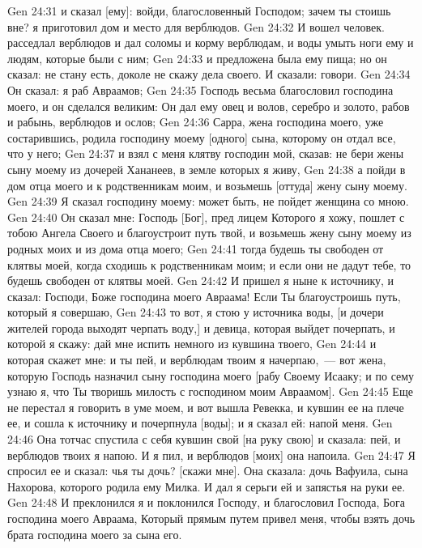\vs Gen 24:31 и сказал [ему]: войди, благословенный Господом; зачем ты стоишь вне? я приготовил дом и место для верблюдов.
\vs Gen 24:32 И вошел человек.  расседлал верблюдов и дал соломы и корму верблюдам, и воды умыть ноги ему и людям, которые были с ним;
\vs Gen 24:33 и предложена была ему пища; но он сказал: не стану есть, доколе не скажу дела своего. И сказали: говори.
\vs Gen 24:34 Он сказал: я раб Авраамов;
\vs Gen 24:35 Господь весьма благословил господина моего, и он сделался великим: Он дал ему овец и волов, серебро и золото, рабов и рабынь, верблюдов и ослов;
\vs Gen 24:36 Сарра, жена господина моего, уже состарившись, родила господину моему [одного] сына, которому он отдал все, что у него;
\vs Gen 24:37 и взял с меня клятву господин мой, сказав: не бери жены сыну моему из дочерей Хананеев, в земле которых я живу,
\vs Gen 24:38 а пойди в дом отца моего и к родственникам моим, и возьмешь [оттуда] жену сыну моему.
\vs Gen 24:39 Я сказал господину моему: может быть, не пойдет женщина со мною.
\vs Gen 24:40 Он сказал мне: Господь [Бог], пред лицем Которого я хожу, пошлет с тобою Ангела Своего и благоустроит путь твой, и возьмешь жену сыну моему из родных моих и из дома отца моего;
\vs Gen 24:41 тогда будешь ты свободен от клятвы моей, когда сходишь к родственникам моим; и если они не дадут тебе, то будешь свободен от клятвы моей.
\vs Gen 24:42 И пришел я ныне к источнику, и сказал: Господи, Боже господина моего Авраама! Если Ты благоустроишь путь, который я совершаю,
\vs Gen 24:43 то вот, я стою у источника воды, [и дочери жителей города выходят черпать воду,] и девица, которая выйдет почерпать, и которой я скажу: дай мне испить немного из кувшина твоего,
\vs Gen 24:44 и которая скажет мне: и ты пей, и верблюдам твоим я начерпаю,~--- вот жена, которую Господь назначил сыну господина моего [рабу Своему Исааку; и по сему узнаю я, что Ты творишь милость с господином моим Авраамом].
\vs Gen 24:45 Еще не перестал я говорить в уме моем, и вот вышла Ревекка, и кувшин ее на плече ее, и сошла к источнику и почерпнула [воды]; и я сказал ей: напой меня.
\vs Gen 24:46 Она тотчас спустила с себя кувшин свой [на руку свою] и сказала: пей, и верблюдов твоих я напою. И я пил, и верблюдов [моих] она напоила.
\vs Gen 24:47 Я спросил ее и сказал: чья ты дочь? [скажи мне]. Она сказала: дочь Вафуила, сына Нахорова, которого родила ему Милка. И дал я серьги ей и запястья на руки ее.
\vs Gen 24:48 И преклонился я и поклонился Господу, и благословил Господа, Бога господина моего Авраама, Который прямым путем привел меня, чтобы взять дочь брата господина моего за сына его.
